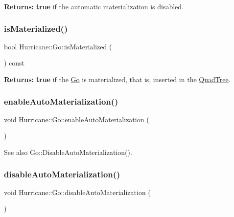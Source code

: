 {\bfseries Returns\+:} {\bfseries true} if the automatic materialization is disabled. \mbox{\label{classHurricane_1_1Go_a0fd2574d3e2e0157230209acdc1b8aa6}} 
\subsubsection{\texorpdfstring{is\+Materialized()}{isMaterialized()}}
{\footnotesize\ttfamily bool Hurricane\+::\+Go\+::is\+Materialized (\begin{DoxyParamCaption}{ }\end{DoxyParamCaption}) const\hspace{0.3cm}{\ttfamily [inline]}}

{\bfseries Returns\+:} {\bfseries true} if the \mbox{\hyperlink{classHurricane_1_1Go}{Go}} is materialized, that is, inserted in the \mbox{\hyperlink{classHurricane_1_1QuadTree}{Quad\+Tree}}. \mbox{\label{classHurricane_1_1Go_ab0b1ca3c606247e1ebd7cab8fa828b04}} 
\subsubsection{\texorpdfstring{enable\+Auto\+Materialization()}{enableAutoMaterialization()}}
{\footnotesize\ttfamily void Hurricane\+::\+Go\+::enable\+Auto\+Materialization (\begin{DoxyParamCaption}{ }\end{DoxyParamCaption})\hspace{0.3cm}{\ttfamily [static]}}

\begin{DoxySeeAlso}{See also}
Go\+::\+Disable\+Auto\+Materialization(). 
\end{DoxySeeAlso}
\mbox{\label{classHurricane_1_1Go_a0d49d22a3788e8001e58152e62b9f3cc}} 
\subsubsection{\texorpdfstring{disable\+Auto\+Materialization()}{disableAutoMaterialization()}}
{\footnotesize\ttfamily void Hurricane\+::\+Go\+::disable\+Auto\+Materialization (\begin{DoxyParamCaption}{ }\end{DoxyParamCaption})\hspace{0.3cm}{\ttfamily [static]}}

